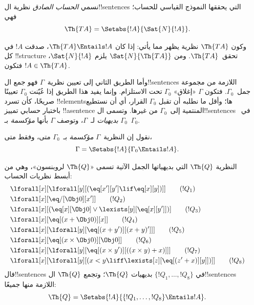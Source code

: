 \documentclass[../../../include/open-logic-section]{subfiles}
\begin{document}
\begin{defn}
نسمي \emph{الحساب الصادق} نظرية ال!!{sentence}s التي يحققها
النموذج القياسي للحساب؛ فهي
\[
\Th{TA} = \Setabs{!A}{\Sat{N}{!A}}.
\]
\end{defn}

وكون $\Th{TA}$ نظرية يظهر مما يأتي: إذا كان
$\Th{TA}\Entails !A$، صدقت $!A$ في كل !!{structure}
تحقق~$\Th{TA}$. ومن $\Sat{N}{\Th{TA}}$ يلزم
$\Sat{N}{!A}$، فتكون $!A\in\Th{TA}$.

وأما الطريق الثاني إلى تعيين نظرية~$\Gamma$ فهو جمع
ال!!{sentence}s اللازمة من مجموعة جمل~$\Gamma_0$.
فتكون $\Gamma$ «إغلاق» $\Gamma_0$ تحت الاستلزام.
وإنما يفيد هذا الطريق إذا عُيّنت $\Gamma_0$ تعيينًا
صريحًا، كأن تسرد !!{element}sها؛ وأقل ما نطلبه أن
تقبل $\Gamma_0$ القرار، أي أن نستطيع باختبار حسابي
تمييز !!a{sentence} المنتمية إلى~$\Gamma_0$ من غيرها.
وتسمى ال!!{sentence}s في~$\Gamma_0$ \emph{بديهيات}
لـ~$\Gamma$، وتوصف $\Gamma$ بأنها \emph{مؤكسمة}
بـ~$\Gamma_0$.

\begin{defn}
نقول إن النظرية~$\Gamma$ \emph{مؤكسمة} بـ~$\Gamma_0$ متى، وفقط متى،
\[
\Gamma = \Setabs{!A}{\Gamma_0 \Entails !A}.
\]
\end{defn}

\begin{defn}
النظرية $\Th{Q}$ التي بديهياتها الجمل الآتية تسمى
«$\Th{Q}$ لروبنسون»، وهي من أبسط نظريات الحساب:
\begin{align*}
& \lforall[x][\lforall[y][(\eq[x'][y'] \lif \eq[x][y])]] \tag{$!Q_1$}\\
& \lforall[x][\eq/[\Obj 0][x']] \tag{$!Q_2$}\\
& \lforall[x][(\eq[x][\Obj 0] \lor \lexists[y][\eq[x][y']])] \tag{$!Q_3$}\\
& \lforall[x][\eq[(x + \Obj 0)][x]] \tag{$!Q_4$}\\
& \lforall[x][\lforall[y][\eq[(x + y')][(x + y)']]] \tag{$!Q_5$}\\
& \lforall[x][\eq[(x \times \Obj 0)][\Obj 0]] \tag{$!Q_6$}\\
& \lforall[x][\lforall[y][\eq[(x \times y')][((x \times y) + x)]]] \tag{$!Q_7$}\\
& \lforall[x][\lforall[y][(x < y \liff \lexists[z][\eq[(z' + x)][y]])]] \tag{$!Q_8$}
\end{align*}
فال!!{sentence}s في $\{!Q_1,\dots,!Q_8\}$ بديهيات $\Th{Q}$؛
وتجمع $\Th{Q}$ ال!!{sentence}s اللازمة منها جميعًا:
\[
\Th{Q} = \Setabs{!A}{\{!Q_1, \dots, !Q_8\} \Entails !A}.
\]
\end{defn}
\end{document}
